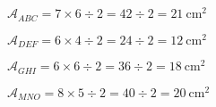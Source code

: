 \exo{}

$\mathcal{A}_{ABC}=7\times6\div2=42\div2=21~\text{cm}^2$

$\mathcal{A}_{DEF}=6\times4\div2=24\div2=12~\text{cm}^2$

$\mathcal{A}_{GHI}=6\times6\div2=36\div2=18~\text{cm}^2$

$\mathcal{A}_{MNO}=8\times5\div2=40\div2=20~\text{cm}^2$